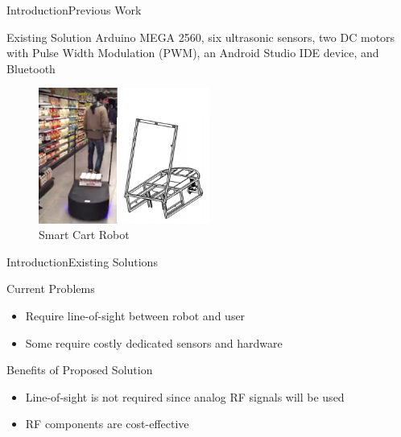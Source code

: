 \documentclass{beamer}
\begin{document}

\begin{frame}{Introduction}{Previous Work}
  \begin{block}{Existing Solution}
    Arduino MEGA 2560, six ultrasonic sensors, two DC motors with Pulse Width Modulation (PWM), an Android Studio IDE device, and Bluetooth~\cite{Rawashdeh2017-Person}
  \end{block}
    \begin{figure}[b]
        \centering
        \includegraphics[width=0.50\textwidth]{figs/img/SmartCart}
        \caption{Smart Cart Robot}
    \end{figure}
\end{frame}


\begin{frame}{Introduction}{Existing Solutions}
  \begin{block}{Current Problems}
    \begin{itemize}
      \item Require line-of-sight between robot and user
      \item Some require costly dedicated sensors and hardware
    \end{itemize}
  \end{block}
  \pause
  \begin{block}{Benefits of Proposed Solution}
    \begin{itemize}
      \item Line-of-sight is not required since analog RF signals will be used
      \item RF components are cost-effective
    \end{itemize}
  \end{block}
\end{frame}

\end{document}
